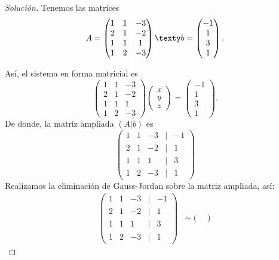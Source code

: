 \documentclass[a4,11pt]{aleph-notas}
\begin{document}
\begin{proof}[Solución]\hspace{0pt}
    Tenemos las matrices
    \[
        A = \begin{pmatrix}
            1&1&-3\\2&1&-2\\1&1&1\\1&2&-3
        \end{pmatrix}
        \texty
        b = \begin{pmatrix}
             -1 \\ 1\\ 3 \\ 1
        \end{pmatrix}.
    \]
    
    Así, el sistema en forma matricial es
    \[
        \begin{pmatrix}
            1&1&-3\\2&1&-2\\1&1&1\\1&2&-3
        \end{pmatrix}
        \begin{pmatrix}
            x \\ y\\ z
        \end{pmatrix}
        =
        \begin{pmatrix}
            -1 \\ 1\\ 3 \\ 1
        \end{pmatrix}.
    \]
    De donde, la matriz ampliada $(A|b)$ es
    \[
        \begin{pmatrix}
            1&1&-3&|&-1\\
            2&1&-2&|&1\\
            1&1&1&|&3\\
            1&2&-3&|&1
         \end{pmatrix}
    \]
    Realizamos la eliminación de Gauss-Jordan sobre la matriz ampliada, así:
    \begin{align*}
        \begin{pmatrix}
            1&1&-3&|&-1\\
            2&1&-2&|&1\\
            1&1&1&|&3\\
            1&2&-3&|&1
        \end{pmatrix}
        & \sim 
        \begin{pmatrix}

\end{pmatrix}
\end{align*}
\end{proof}
\end{document}
